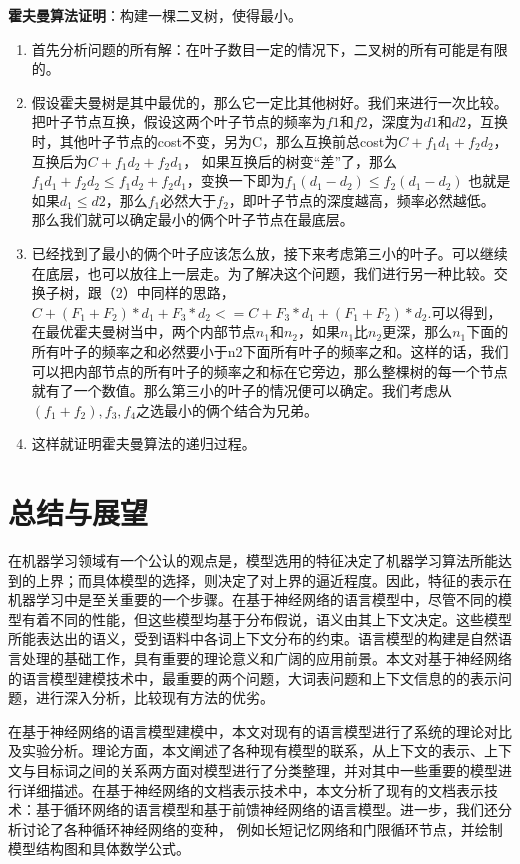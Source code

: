 \documentclass[12pt,a4paper]{article}
\begin{document}
\textbf{霍夫曼算法证明}：构建一棵二叉树，使得最小。
\begin{enumerate}
  \item 首先分析问题的所有解：在叶子数目一定的情况下，二叉树的所有可能是有限的。
\item 假设霍夫曼树是其中最优的，那么它一定比其他树好。我们来进行一次比较。
把叶子节点互换，假设这两个叶子节点的频率为$f1$和$f2$，深度为$d1$和$d2$，互换时，其他叶子节点的cost不变，另为C，那么互换前总cost为$C+f_1d_1+f_2d_2$，互换后为$C+f_1d_2+f_2d_1$，
如果互换后的树变“差”了，那么$f_1d_1+f_2d_2 \le f_1d_2 + f_2d_1$，变换一下即为$f_1(d_1-d_2)\le f_2(d_1-d_2)$
也就是如果$d_1 \le d2$，那么$f_1$必然大于$f_2$，即叶子节点的深度越高，频率必然越低。
那么我们就可以确定最小的俩个叶子节点在最底层。
\item 已经找到了最小的俩个叶子应该怎么放，接下来考虑第三小的叶子。可以继续在底层，也可以放往上一层走。为了解决这个问题，我们进行另一种比较。交换子树，跟（2）中同样的思路，$C+(F_1+F_2)*d_1+F_3*d_2 <= C+F_3*d_1+(F_1+F_2)*d_2$.可以得到，在最优霍夫曼树当中，两个内部节点$n_1$和$n_2$，如果$n_1$比$n_2$更深，那么$n_1$下面的所有叶子的频率之和必然要小于n2下面所有叶子的频率之和。这样的话，我们可以把内部节点的所有叶子的频率之和标在它旁边，那么整棵树的每一个节点就有了一个数值。那么第三小的叶子的情况便可以确定。我们考虑从$(f_1+f_2),f_3,f_4$之选最小的俩个结合为兄弟。
\item 这样就证明霍夫曼算法的递归过程。
\end{enumerate}



\section{总结与展望}
在机器学习领域有一个公认的观点是，模型选用的特征决定了机器学习算法所能达到的上界；而具体模型的选择，则决定了对上界的逼近程度。因此，特征的表示在机器学习中是至关重要的一个步骤。在基于神经网络的语言模型中，尽管不同的模型有着不同的性能，但这些模型均基于分布假说，语义由其上下文决定。这些模型所能表达出的语义，受到语料中各词上下文分布的约束。语言模型的构建是自然语言处理的基础工作，具有重要的理论意义和广阔的应用前景。本文对基于神经网络的语言模型建模技术中，最重要的两个问题，大词表问题和上下文信息的的表示问题，进行深入分析，比较现有方法的优劣。

在基于神经网络的语言模型建模中，本文对现有的语言模型进行了系统的理论对比及实验分析。理论方面，本文阐述了各种现有模型的联系，从上下文的表示、上下文与目标词之间的关系两方面对模型进行了分类整理，并对其中一些重要的模型进行详细描述。在基于神经网络的文档表示技术中，本文分析了现有的文档表示技术：基于循环网络的语言模型和基于前馈神经网络的语言模型。进一步，我们还分析讨论了各种循环神经网络的变种， 例如长短记忆网络和门限循环节点，并绘制模型结构图和具体数学公式。
\end{document}

